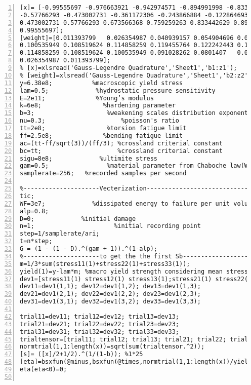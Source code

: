 \begin{lstlisting}[numbers=left, numberstyle=\tiny, keywordstyle=\color{blue!100}, commentstyle=\color{red!30!green!100!blue!100}, frame=shadowbox, rulesepcolor=\color{red!20!green!20!blue!20}]
[x]= [-0.99555697 -0.976663921 -0.942974571 -0.894991998 -0.833442629 -0.759259263 -0.673566368...
-0.57766293 -0.473002731 -0.361172306 -0.243866884 -0.122864693 0 0.122864693 0.243866884 0.361172306...
0.473002731 0.57766293 0.673566368 0.759259263 0.833442629 0.894991998 0.942974571 0.976663921...
0.99555697];
[weight]=[0.011393799	0.026354987	0.040939157	0.054904696	0.068038334	0.0801407	0.091028262...
0.100535949	0.108519624	0.114858259	0.119455764	0.122242443	0.123176054	0.122242443	0.119455764...
0.114858259	0.108519624	0.100535949	0.091028262	0.0801407	0.068038334	0.054904696	0.040939157...
0.026354987	0.011393799];
% [x]=xlsread('Gauss-Legendre Quadrature','Sheet1','b1:z1');
% [weight]=xlsread('Gauss-Legendre Quadrature','Sheet1','b2:z2');
y=6.38e8;           %macroscopic yield stress
lam=0.5;             %hydrostatic pressure sensitivity
E=2e11;              %Young’s modulus
k=6e8;                 %hardening parameter
b=3;                    %weakening scales distribution exponent
nu=0.3;                     %poisson's ratio
tt=2e8;                 %torsion fatigue limit
ff=2.5e8;              %bending fatigue limit
ac=(tt-ff/sqrt(3))/(ff/3); %crossland criterial constant
bc=tt;                     %crossland criterial constant 
sigu=8e8;             %ultimite stress
gam=0.5;                %material parameter from Chaboche law(Wohler curve exponent)
samplerate=256;   %recorded samples per second

%---------------------Vecterization-----------------------------
tic;
WF=3e7;             %dissipated energy to failure per unit volume
alp=0.8;
D=0;             %initial damage
n=1;                      %initial recording point
step=1/samplerate/ari;
t=n*step;
G = (1 - (1 - D).^(gam + 1)).^(1-alp);
%---------------------to get the the first Sb-----------------------------
m=1/3*sum(stress11(1)+stress22(1)+stress33(1));
yield(1)=y-lam*m; %macro yield strength considering mean stress effect
dev1=[stress11(1) stress12(1) stress13(1);stress21(1) stress22(1) stress23(1);stress31(1) stress32(1) stress33(1)]-m*diag([1,1,1]);
dev11=dev1(1,1); dev12=dev1(1,2); dev13=dev1(1,3);
dev21=dev1(2,1); dev22=dev1(2,2); dev23=dev1(2,3);
dev31=dev1(3,1); dev32=dev1(3,2); dev33=dev1(3,3);

trial11=dev11; trial12=dev12; trial13=dev13;
trial21=dev21; trial22=dev22; trial23=dev23;
trial31=dev31; trial32=dev32; trial33=dev33;
trialtensor=[trial11; trial12; trial13; trial21; trial22; trial23;trial31; trial32; trial33];
normtrial(1,1:length(x))=sqrt(sum(trialtensor.^2));
[s]= ([x]/2+1/2).^(1/(1-b)); %1*25
[eta]=bsxfun(@minus,bsxfun(@times,normtrial(1,1:length(x))/yield(1),s),1); %1*25
eta(eta<0)=0;


\end{lstlisting}

